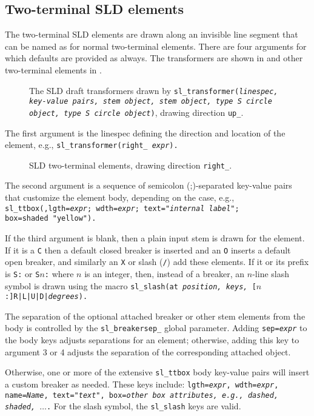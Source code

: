 \subsection{Two-terminal SLD elements\label{TwoTermSLD:}}
The two-terminal SLD elements are drawn along an invisible line segment
that can be named as for normal two-terminal elements.
There are four arguments for which defaults are provided as always.
The transformers are shown in  and other two-terminal
elements in .
\begin{figure}[h!t]
   \SLDTransformers
   \caption{The SLD draft transformers
     drawn by {\tt sl\_transformer({\sl linespec, key-value pairs,
     stem object, stem object, type {\tt S} circle object,
     type {\tt S} circle object})},
     drawing direction {\tt up\_}.}
   \label{SLDTransformers}
   \end{figure}

The first argument is the linespec defining the direction and location
of the element, e.g.,
{\tt sl\_transformer(right\_ {\sl expr}).}
\begin{figure}[h!t]
   \SLDTwoTerms
   \caption{SLD two-terminal elements, drawing direction {\tt right\_}.}
   \label{SLDTwoTerms}
   \end{figure}

The second argument is a sequence of semicolon (;)-separated key-value
pairs that customize the element body, depending on the case, e.g.,
{\tt sl\_ttbox(,lgth={\sl expr}; wdth={\sl expr};
 text="{\sl internal label}"; box=shaded~"yellow").}

If the third argument is blank, then a plain input stem is drawn for the
element.
If it is a {\tt C} then a default closed
breaker is inserted and an {\tt O} inserts a default open breaker,
and similarly an {\tt X} or slash ({\tt/}) add these elements.
If it or its prefix is {\tt S:} or {\tt S$n$:} where $n$ is an integer,
then, instead of a breaker,
an $n$-line slash symbol is drawn using the macro
{\tt sl\_slash(at {\sl position, keys,} [$n$:]R|L|U|D|{\sl degrees}).}

The separation of the optional attached breaker or other stem elements from
the body is controlled by the {\tt sl\_breakersep\_} global
parameter.  Adding {\tt sep={\sl expr}} to the body keys
adjusts separations for an element; otherwise, adding
this key to argument 3 or 4 adjusts the separation of
the corresponding attached object.

Otherwise, one or more of the extensive {\tt sl\_ttbox} body
key-value pairs will insert a custom breaker as needed.  These keys include:
{\tt lgth={\sl expr},
wdth={\sl expr},
name={\sl Name},
text="{\sl text}",
box={\sl other box attributes, e.g., {\tt dashed, shaded,} $\ldots$}.}
For the slash symbol, the {\tt sl\_slash} keys are valid. 

